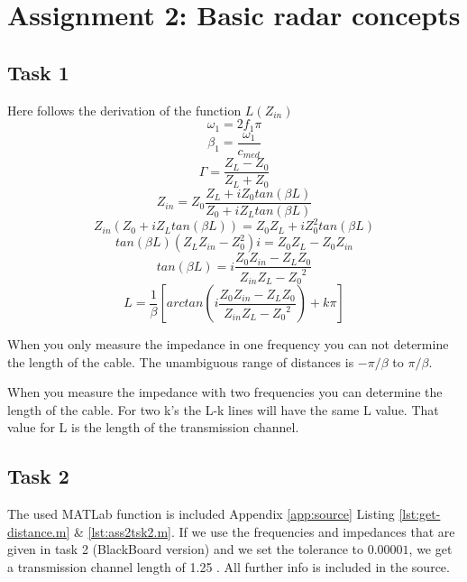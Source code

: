 \documentclass[final]{scrreprt} %
\begin{document}
\chapter{Assignment 2: Basic radar concepts}
\label{ch:sk5-ass2}
\section{Task 1}
\label{sec:sk5-tsk1}
Here follows the derivation of the function $L(Z_{in})$
\begin{equation}
\omega_{1}=2f_1\pi
\end{equation}
\begin{equation}
\beta_{1}=\frac{\omega_{1}}{c_{med}}
\end{equation}
\begin{equation}
\Gamma=\frac{Z_L-Z_0}{Z_L+Z_0}
\end{equation}
\begin{equation}
{Z}_{in}=Z_0\frac{Z_L+iZ_0tan(\beta L)}{Z_0+iZ_Ltan(\beta L)}
\end{equation}
\begin{equation}
{Z}_{in} \left(Z_0 + i Z_L tan(\beta L)\right)=Z_0 Z_L+iZ_0^2 tan(\beta L)
\end{equation}
\begin{equation}
tan(\beta L) (Z_L Z_{in}-Z_0^2) i=Z_0 Z_L-Z_0 Z_{in}
\end{equation}
\begin{equation}
tan(\beta L)=i\frac{Z_0 Z_{in} - Z_L Z_0}{Z_{in} Z_L - {Z_0}^2}
\end{equation}
\begin{equation}
L=\frac{1}{\beta}\left[arctan\left(i\frac{Z_0 Z_{in} - Z_L Z_0}{Z_{in} Z_L - {Z_0}^2}\right)+k\pi\right]
\end{equation}

When you only measure the impedance in one frequency you can not determine the length of the cable.
The unambiguous range of distances is $-\pi/\beta$ to $\pi/\beta$.

When you measure the impedance with two frequencies you can determine the length of the cable.
For two k's the L-k lines will have the same L value. That value for L is the length of the transmission channel.

\section{Task 2}
\label{sec:sk5-tsk2}
The used MATLab function is included Appendix \ref{app:source} Listing \ref{lst:get-distance.m} \& \ref{lst:ass2tsk2.m}.
If we use the frequencies and impedances that are given in task 2 (BlackBoard version) and we set the tolerance to $0.00001$, we get a transmission channel length of 1.25 \meter.
All further info is included in the source.
\end{document}
